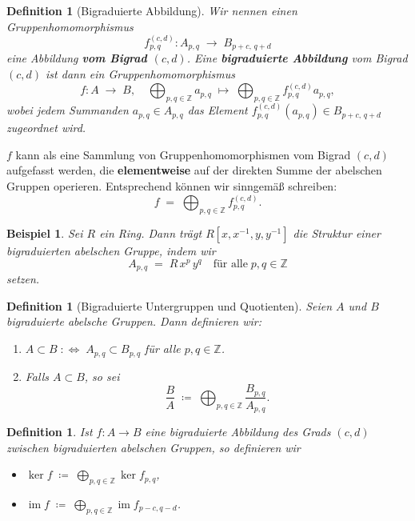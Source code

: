 \documentclass[12pt]{article}
\numberwithin{conj}{section}
\newtheorem{definition}[conj]{Definition}
\newtheorem{example}[conj]{Beispiel}
\newcommand{\Z}{\mathbb{Z}}
\newcommand{\ima}{\operatorname{im}}
\begin{document}
    \begin{definition}[Bigraduierte Abbildung]
        Wir nennen einen Gruppenhomomorphismus
        \[
            f^{(c,d)}_{p,q}: A_{p,q}\;\longrightarrow\; B_{p+c,\,q+d}
        \]
        eine Abbildung \textbf{vom Bigrad $(c,d)$}. Eine \textbf{bigraduierte
        Abbildung} vom Bigrad $(c,d)$ ist dann ein Gruppenhomomorphismus
        \[
            f : A \;\longrightarrow\; B,\quad \bigoplus_{p,q \in \Z}a_{p,q}\;\longmapsto
            \; \bigoplus_{p,q \in \Z}f^{(c,d)}_{p,q} a_{p,q} ,
        \]
        wobei jedem Summanden $a_{p,q}\in A_{p,q}$ das Element
        $f^{(c,d)}_{p,q}(a_{p,q}) \in B_{p+c,\,q+d}$ zugeordnet wird.
    \end{definition}

    $f$ kann als eine Sammlung von Gruppenhomomorphismen vom Bigrad $(c,d)$
    aufgefasst werden, die \textbf{elementweise} auf der direkten Summe der
    abelschen Gruppen operieren. Entsprechend können wir sinngemäß schreiben:
    \[
        f \;=\; \bigoplus_{p,q \in \Z}f^{(c,d)}_{p,q}.
    \]

    \begin{example}
        Sei $R$ ein Ring. Dann trägt $R[x,x^{-1},y,y^{-1}]$ die Struktur einer
        bigraduierten abelschen Gruppe, indem wir
        \[
            A_{p,q}\;=\; R\,x^{p}\,y^{q} \quad\text{für alle}\; p,q \in \Z
        \]
        setzen.
    \end{example}

    \begin{definition}[Bigraduierte Untergruppen und Quotienten]
        Seien $A$ und $B$ bigraduierte abelsche Gruppen. Dann definieren wir:
        \begin{enumerate}[nolistsep]
            \item $A \subset B \;\colon\Leftrightarrow\; A_{p,q}\subset B_{p,q}$ für alle
                $p,q \in \Z$.

            \item Falls $A \subset B$, so sei
                \[
                    \displaystyle \frac{B}{A}\;\coloneqq\; \bigoplus_{p,q \in \Z}\frac{B_{p,q}}{A_{p,q}}
                    .
                \]
        \end{enumerate}
    \end{definition}

    \begin{definition}
        Ist $f: A \to B$ eine bigraduierte Abbildung des Grads $(c,d)$ zwischen bigraduierten
        abelschen Gruppen, so definieren wir
        \begin{itemize}[nolistsep]
            \item $\displaystyle \ker f \;\coloneqq\; \bigoplus_{p,q \in \Z}\ker  
                f_{p,q} $,

            \item $\displaystyle \ima f \;\coloneqq\; \bigoplus_{p,q \in \Z}\ima  
                f_{p-c,q-d} $.
        \end{itemize}
    \end{definition}
\end{document}
